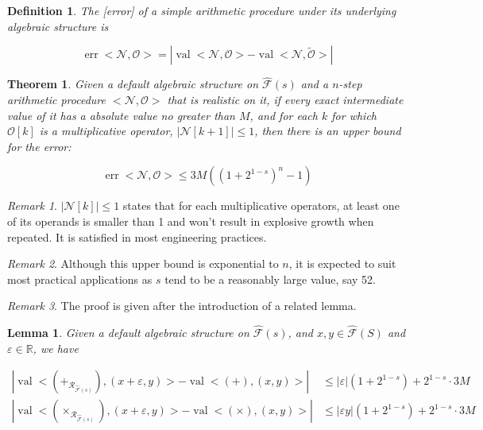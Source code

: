 \documentclass{book}
\newtheorem{definition}{Definition}
\newtheorem{lemma}{Lemma}
\newtheorem{theorem}{Theorem}
\theoremstyle{definition}\newtheorem{mechanism}{Mechanism}
\theoremstyle{remark}\newtheorem*{remark}{Remark}
\begin{document}
\begin{definition}
	The [error] of a simple arithmetic procedure under its underlying algebraic structure is
	
	\begin{equation*}
		\operatorname{err} <\mathcal N, \mathcal O> = \left| \operatorname{val}<\mathcal N, \mathcal O> - \operatorname{val} <\mathcal N, \tilde{\mathcal O}> \right|
	\end{equation*}
\end{definition}

\begin{theorem}\label{thm:weak-fp-bound}
	Given a default algebraic structure on $\hat{\mathcal {F}}(s)$ and a $n$-step arithmetic procedure $<\mathcal N, \mathcal O>$ that is realistic on it, if every exact intermediate value of it has a absolute value no greater than $M$, and for each $k$ for which $\mathcal O[k]$ is a multiplicative operator, $|\mathcal N[k + 1]| \le 1$, then there is an upper bound for the error:
	
	\begin{equation*}
		\operatorname{err} <\mathcal N, \mathcal O> \le 3M\left(\left(1 + 2^{1 - s}\right)^n - 1\right)
	\end{equation*}
\end{theorem}

\begin{remark}
	$|\mathcal N[k]| \le 1$ states that for each multiplicative operators, at least one of its operands is smaller than 1 and won't result in explosive growth when repeated. It is satisfied in most engineering practices.
\end{remark}

\begin{remark}
	Although this upper bound is exponential to $n$, it is expected to suit most practical applications as $s$ tend to be a reasonably large value, say 52.
\end{remark}

\begin{remark}
	The proof is given after the introduction of a related lemma.
\end{remark}

\begin{lemma}\label{lmm:op-err-bound}
	Given a default algebraic structure on $\hat{\mathcal {F}}(s)$, and $x, y \in \hat{\mathcal{F}}(S)$ and $\varepsilon \in \mathbb R$, we have
	
	\begin{align*}
		\left| \operatorname{val} <(+_{\mathcal{R}_{\hat{\mathcal {F}}(s)}}), (x + \varepsilon, y)> - \operatorname{val} <(+), (x, y)> \right| & \le |\varepsilon|(1 + 2^{1 - s}) + 2^{1 - s} \cdot 3M\\
		\left| \operatorname{val} <(\times_{\mathcal{R}_{\hat{\mathcal {F}}(s)}}), (x + \varepsilon, y)> - \operatorname{val} <(\times), (x, y)> \right| & \le |\varepsilon y|(1 + 2^{1 - s}) + 2^{1 - s} \cdot 3M\\
	\end{align*}
\end{lemma}
\end{document}
